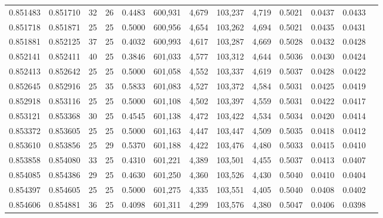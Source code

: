 \begin{tabular}{rrrrrrrrrrrrr}
0.851483 & 0.851710 &    32 &  26 &                                     0.4483 & 600,931 &   4,679 & 103,237 &   4,719 & 0.5021 & 0.0437 & 0.0433 \\
0.851718 & 0.851871 &    25 &  25 &                                     0.5000 & 600,956 &   4,654 & 103,262 &   4,694 & 0.5021 & 0.0435 & 0.0431 \\
0.851881 & 0.852125 &    37 &  25 &                                     0.4032 & 600,993 &   4,617 & 103,287 &   4,669 & 0.5028 & 0.0432 & 0.0428 \\
0.852141 & 0.852411 &    40 &  25 &                                     0.3846 & 601,033 &   4,577 & 103,312 &   4,644 & 0.5036 & 0.0430 & 0.0424 \\
0.852413 & 0.852642 &    25 &  25 &                                     0.5000 & 601,058 &   4,552 & 103,337 &   4,619 & 0.5037 & 0.0428 & 0.0422 \\
0.852645 & 0.852916 &    25 &  35 &                                     0.5833 & 601,083 &   4,527 & 103,372 &   4,584 & 0.5031 & 0.0425 & 0.0419 \\
0.852918 & 0.853116 &    25 &  25 &                                     0.5000 & 601,108 &   4,502 & 103,397 &   4,559 & 0.5031 & 0.0422 & 0.0417 \\
0.853121 & 0.853368 &    30 &  25 &                                     0.4545 & 601,138 &   4,472 & 103,422 &   4,534 & 0.5034 & 0.0420 & 0.0414 \\
0.853372 & 0.853605 &    25 &  25 &                                     0.5000 & 601,163 &   4,447 & 103,447 &   4,509 & 0.5035 & 0.0418 & 0.0412 \\
0.853610 & 0.853856 &    25 &  29 &                                     0.5370 & 601,188 &   4,422 & 103,476 &   4,480 & 0.5033 & 0.0415 & 0.0410 \\
0.853858 & 0.854080 &    33 &  25 &                                     0.4310 & 601,221 &   4,389 & 103,501 &   4,455 & 0.5037 & 0.0413 & 0.0407 \\
0.854085 & 0.854386 &    29 &  25 &                                     0.4630 & 601,250 &   4,360 & 103,526 &   4,430 & 0.5040 & 0.0410 & 0.0404 \\
0.854397 & 0.854605 &    25 &  25 &                                     0.5000 & 601,275 &   4,335 & 103,551 &   4,405 & 0.5040 & 0.0408 & 0.0402 \\
0.854606 & 0.854881 &    36 &  25 &                                     0.4098 & 601,311 &   4,299 & 103,576 &   4,380 & 0.5047 & 0.0406 & 0.0398 \\

\end{tabular}
